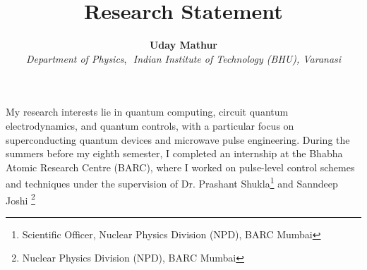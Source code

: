 \documentclass[twocolumn]{article}
\title{\vspace{-1.5cm}\textbf{Research Statement}}
\author{\textbf{Uday Mathur}\\ 
        \textit{Department of Physics},\,\,
        \textit{Indian Institute of Technology (BHU), Varanasi}\\}
\date{}
\begin{document}
\twocolumn[
\maketitle

\vspace{-0.3cm}  %

\begin{center}
    \vspace{-0.5cm} %
    \vspace{-0.5cm} %
\end{center}

\vspace{0.5cm}  %
]
My research interests lie in quantum computing, circuit quantum electrodynamics, and quantum controls, with a particular focus on superconducting quantum devices and microwave pulse engineering. During the summers before my eighth semester, I completed an internship at the Bhabha Atomic Research Centre (BARC), where I worked on pulse-level control schemes and techniques under the supervision of Dr. Prashant Shukla\footnote{Scientific Officer, Nuclear Physics Division (NPD), BARC Mumbai} and Sanndeep Joshi \footnote{Nuclear Physics Division (NPD), BARC Mumbai}
\end{document}
